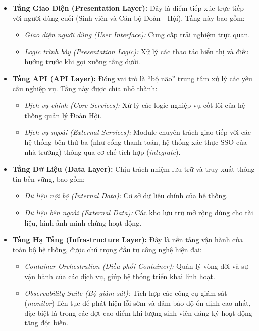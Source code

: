 \begin{itemize}
    \item \textbf{Tầng Giao Diện (Presentation Layer):} 
    Đây là điểm tiếp xúc trực tiếp với người dùng cuối (Sinh viên và Cán bộ Đoàn - Hội). Tầng này bao gồm:
    \begin{itemize}
        \item \textit{Giao diện người dùng (User Interface):} Cung cấp trải nghiệm trực quan.
        \item \textit{Logic trình bày (Presentation Logic):} Xử lý các thao tác hiển thị và điều hướng trước khi gọi xuống tầng dưới.
    \end{itemize}

    \item \textbf{Tầng API (API Layer):} 
    Đóng vai trò là ``bộ não'' trung tâm xử lý các yêu cầu nghiệp vụ. Tầng này được chia nhỏ thành:
    \begin{itemize}
        \item \textit{Dịch vụ chính (Core Services):} Xử lý các logic nghiệp vụ cốt lõi của hệ thống quản lý Đoàn Hội.
        \item \textit{Dịch vụ ngoài (External Services):} Module chuyên trách giao tiếp với các hệ thống bên thứ ba (như cổng thanh toán, hệ thống xác thực SSO của nhà trường) thông qua cơ chế tích hợp (\textit{integrate}).
    \end{itemize}

    \item \textbf{Tầng Dữ Liệu (Data Layer):} 
    Chịu trách nhiệm lưu trữ và truy xuất thông tin bền vững, bao gồm:
    \begin{itemize}
        \item \textit{Dữ liệu nội bộ (Internal Data):} Cơ sở dữ liệu chính của hệ thống.
        \item \textit{Dữ liệu bên ngoài (External Data):} Các kho lưu trữ mở rộng dùng cho tài liệu, hình ảnh minh chứng hoạt động.
    \end{itemize}

    \item \textbf{Tầng Hạ Tầng (Infrastructure Layer):} 
    Đây là nền tảng vận hành của toàn bộ hệ thống, được chú trọng đầu tư công nghệ hiện đại:
    \begin{itemize}
        \item \textit{Container Orchestration (Điều phối Container):} Quản lý vòng đời và sự vận hành của các dịch vụ, giúp hệ thống triển khai linh hoạt.
        \item \textit{Observability Suite (Bộ giám sát):} Tích hợp các công cụ giám sát (\textit{monitor}) liên tục để phát hiện lỗi sớm và đảm bảo độ ổn định cao nhất, đặc biệt là trong các đợt cao điểm khi lượng sinh viên đăng ký hoạt động tăng đột biến.
    \end{itemize}
\end{itemize}

